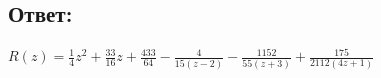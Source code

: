 \documentclass[12pt, a4paper]{article}
\begin{document}
    \subsection*{Ответ:}
    \begin{math}
        R(z) = \frac{1}{4}z^2 + \frac{33}{16}z + \frac{433}{64} -
        \frac{4}{15(z-2)} - \frac{1152}{55(z + 3)} + \frac{175}{2112(4z + 1)}
    \end{math}
\end{document}
